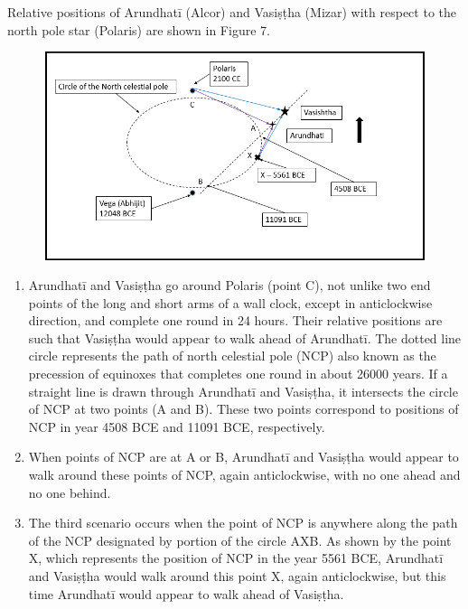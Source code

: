 Relative positions of Arundhatī (Alcor) and Vasiṣṭha (Mizar) with respect to the north pole star (Polaris) are shown in Figure 7.

\begin{figure}[H]
\includegraphics[scale=.3]{images/chap2-8.jpg}\\[0.1cm]
\end{figure}

\begin{enumerate}
\itemsep=0pt
\item Arundhatī and Vasiṣṭha go around Polaris (point C), not unlike two end points of the long and short arms of a wall clock, except in anticlockwise direction, and complete one round in 24 hours. Their relative positions are such that Vasiṣṭha would appear to walk ahead of Arundhatī. The dotted line circle represents the path of north celestial pole (NCP) also known as the precession of equinoxes that completes one round in about 26000 years. If a straight line is drawn through Arundhatī and Vasiṣṭha, it intersects the circle of NCP at two points (A and B). These two points correspond to positions of NCP in year 4508 BCE and 11091 BCE, respectively.

 \item When points of NCP are at A or B, Arundhatī and Vasiṣṭha would appear to walk around these points of NCP, again anticlockwise, with no one ahead and no one behind.

 \item The third scenario occurs when the point of NCP is anywhere along the path of the NCP designated by portion of the circle AXB. As shown by the point X, which represents the position of NCP in the year 5561 BCE, Arundhatī and Vasiṣṭha would walk around this point X, again anticlockwise, but this time Arundhatī would appear to walk ahead of Vasiṣṭha.

\end{enumerate}

